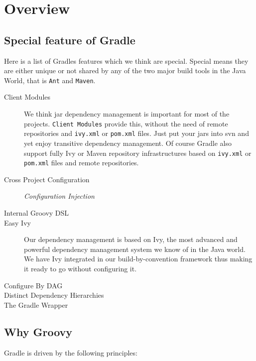 \chapter{Overview} %
\label{cha:overview}

\section{Special feature of Gradle} %
\label{sec:special_feature_of_gradle}
Here is a list of Gradles features which we think are special. Special means they are either unique or not shared by any of the two major build tools in the Java World, that is \texttt{Ant} and \texttt{Maven}.
\begin{description}
	\item[Client Modules] We think jar dependency management is important for most of the projects. \texttt{Client Modules} provide this, without the need of remote repositories and \texttt{ivy.xml} or \texttt{pom.xml} files. Just put your jars into svn and yet enjoy transitive dependency management. Of course Gradle also support fully Ivy or Maven repository infrastructures based on \texttt{ivy.xml} or \texttt{pom.xml} files and remote repositories.
	\item[Cross Project Configuration] \emph{Configuration Injection}
	\item[Internal Groovy DSL] 
	\item[Easy Ivy] Our dependency management is based on Ivy, the most advanced and powerful dependency management system we know of in the Java world. We have Ivy integrated in our build-by-convention framework thus making it ready to go without configuring it.
	\item[Configure By DAG] 
	\item[Distinct Dependency Hierarchies]
    \item[The Gradle Wrapper]  
\end{description}

\section{Why Groovy} %
\label{sec:why_groovy}


Gradle is driven by the following principles:

